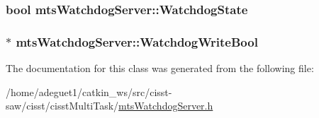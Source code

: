 \hypertarget{classmts_watchdog_server_add9a62bd26805a1fe77314242d91efd6}{
\subsubsection[{Watchdog\-State}]{\setlength{\rightskip}{0pt plus 5cm}bool mts\-Watchdog\-Server\-::\-Watchdog\-State\hspace{0.3cm}{\ttfamily [protected]}}}\label{classmts_watchdog_server_add9a62bd26805a1fe77314242d91efd6}
\hypertarget{classmts_watchdog_server_a89fd0c0ada0929c6804b03a39971a2e3}{
\subsubsection[{Watchdog\-Write\-Bool}]{$\ast$ mts\-Watchdog\-Server\-::\-Watchdog\-Write\-Bool\hspace{0.3cm}{\ttfamily [protected]}}}\label{classmts_watchdog_server_a89fd0c0ada0929c6804b03a39971a2e3}


The documentation for this class was generated from the following file\-:\begin{DoxyCompactItemize}
\item 
/home/adeguet1/catkin\-\_\-ws/src/cisst-\/saw/cisst/cisst\-Multi\-Task/\hyperlink{mts_watchdog_server_8h}{mts\-Watchdog\-Server.\-h}\end{DoxyCompactItemize}
